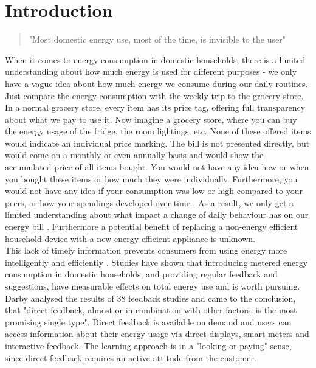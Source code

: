 
\chapter{Introduction}
\label{ch:Introduction}

\begin{quotation}
"Most domestic energy use, most of the time, is invisible to the user" 
\begin{flushright}
\cite{Darby2006}
\end{flushright}
\end{quotation}

When it comes to energy consumption in domestic households, there is a limited understanding about how much energy is used for different purposes - we only have a vague idea about how much energy we consume during our daily routines. Just compare the energy consumption with the weekly trip to the grocery store. In a normal grocery store, every item has its price tag, offering full transparency about what we pay to use it. Now imagine a grocery store, where you can buy the energy usage of the fridge, the room lightings, etc. None of these offered items would indicate an individual price marking. The bill is not presented directly, but would come on a monthly or even annually basis and would show the accumulated price of all items bought. You would not have any idea how or when you bought these items or how much they were individually. Furthermore, you would not have any idea if your consumption was low or high compared to your peers, or how your spendings developed over time  \citep{Kempton1994}. As a result, we only get a limited understanding about what impact a change of daily behaviour has on our energy bill  \citep{Darby2006}. Furthermore a potential benefit of replacing a non-energy efficient household device with a new energy efficient appliance is unknown.\\
This lack of timely information prevents consumers from using energy more intelligently and efficiently \citep{Darby2000}.
Studies have shown that introducing metered energy consumption in domestic households, and providing regular feedback and suggestions, have measurable effects on total energy use and is worth pursuing.  
Darby analysed the results of 38 feedback studies and came to the conclusion, that "direct feedback, almost or in combination with other factors, is the most promising single type". Direct feedback is available on demand and users can access information about their energy usage via direct displays, smart meters and interactive feedback. The learning approach is in a "looking or paying" sense, since direct feedback requires an active attitude from the customer.
